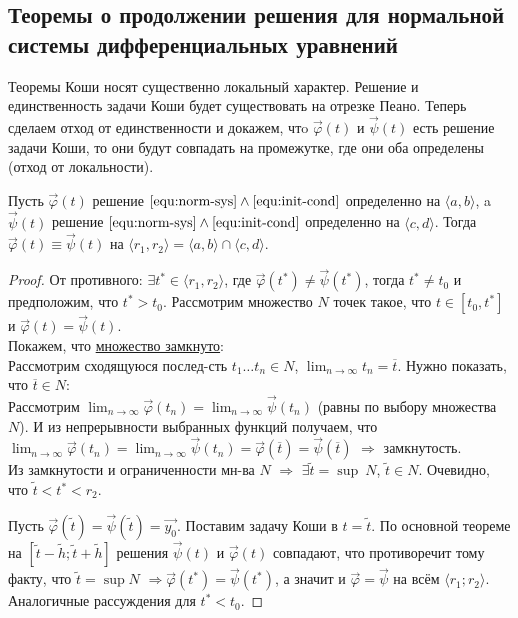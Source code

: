 
\subsection{Теоремы о продолжении решения для нормальной системы дифференциальных уравнений}

Теоремы Коши носят существенно локальный характер. Решение и единственность задачи Коши будет существовать на отрезке Пеано. Теперь сделаем отход от единственности и докажем, чтo $\Vec{\varphi}(t)$ и $\Vec{\psi}(t)$ есть решение задачи Коши, то они будут совпадать на промежутке, где они оба определены (отход от локальности).

\begin{theorem}
    Пусть $\Vec{\varphi}(t)$ решение $\eqref{equ:norm-sys} \wedge \eqref{equ:init-cond}$ определенно на $\langle a, b \rangle$, a  $\Vec{\psi}(t)$ решение $\eqref{equ:norm-sys} \wedge \eqref{equ:init-cond}$ определенно на $\langle c, d \rangle$.
    Тогда $\Vec{\varphi}(t) \equiv \Vec{\psi}(t)$ на $\langle r_1, r_2 \rangle = \langle a, b \rangle \cap \langle c, d \rangle$.
\end{theorem}
\begin{proof}
    От противного: $\exists t^* \in \langle r_1, r_2 \rangle$, где $\Vec{\varphi}(t^*) \neq \Vec{\psi}(t^*)$, тогда $t^* \neq t_0$ и предположим, что $t^* > t_0$. 
    Рассмотрим множество $N$ точек такое, что $t \in [t_0, t^*]$ и $\Vec{\varphi}(t) = \Vec{\psi}(t)$. \\
    Покажем, что \underline{множество замкнуто}: \\
    Рассмотрим сходящуюся послед-сть $t_1 \ldots t_n \in N$, $\displaystyle \lim_{n\to\infty} t_n = \overline{t}$. Нужно показать, что $\overline{t} \in N$:\\
    Рассмотрим $\displaystyle \lim_{n\to\infty} \Vec{\varphi}(t_n) = \lim_{n\to\infty} \Vec{\psi}(t_n)$ (равны по выбору множества $N$). И из непрерывности выбранных функций получаем, что $\displaystyle \lim_{n\to\infty} \Vec{\varphi}(t_n) = \lim_{n\to\infty} \Vec{\psi}(t_n) = \Vec{\varphi}(\overline{t}) = \Vec{\psi}(\overline{t})$ $\Rightarrow$ замкнутость. \\
    Из замкнутости и ограниченности мн-ва $N$ $\Rightarrow$ $\exists \widetilde{t} = \sup\ N$, $\widetilde{t} \in N$. Очевидно, что $\widetilde{t} < t^* < r_2$.
    
    Пусть $\Vec{\varphi}(\widetilde{t}) = \Vec{\psi}(\widetilde{t}) = \vec{y_0}.$ Поставим задачу Коши в $t = \widetilde{t}$. По основной теореме на $[\widetilde{t} - \widetilde{h}; \widetilde{t} + \widetilde{h}]$ решения $\vec{\psi}(t)$ и $\vec{\varphi}(t)$ совпадают, что противоречит тому факту, что $\widetilde{t} = \sup N$ $\Rightarrow  \vec{\varphi} (t^*) = \vec{\psi}(t^*)$, а значит и $\vec{\varphi} = \vec{\psi}$ на всём $\langle r_1; r_2\rangle$. Аналогичные рассуждения для $t^* < t_0$. 
\end{proof}

